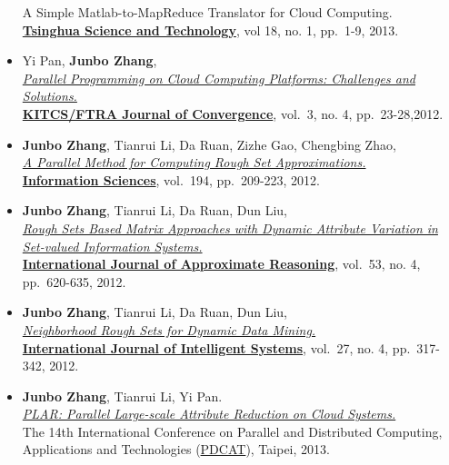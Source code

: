 \documentclass[]{article}
\begin{document}
\begin{itemize}
{{  A Simple Matlab-to-MapReduce Translator for Cloud Computing.}}\\
  \href{http://qhxb.lib.tsinghua.edu.cn/english/}{\textbf{Tsinghua
  Science and Technology}}, vol 18, no. 1, pp.~1-9, 2013.
\item
  Yi Pan, \textbf{Junbo Zhang},\\
  \href{http://www.ftrai.org/xe/index.php?mid=joc_published\&category=37964\&search_keyword=section\&search_target=title\&document_srl=38459}{\emph{Parallel
  Programming on Cloud Computing Platforms: Challenges and
  Solutions.}}\\ \href{http://www.ftrai.org/joc/}{\textbf{KITCS/FTRA
  Journal of Convergence}}, vol.~3, no. 4, pp.~23-28,2012.
\item
  \textbf{Junbo Zhang}, Tianrui Li, Da Ruan, Zizhe Gao, Chengbing
  Zhao,\\ \href{http://dx.doi.org/10.1016/j.ins.2011.12.036}{\emph{A
  Parallel Method for Computing Rough Set Approximations.}}\\
  \href{http://www.journals.elsevier.com/information-sciences}{\textbf{Information
  Sciences}}, vol.~194, pp.~209-223, 2012.
\item
  \textbf{Junbo Zhang}, Tianrui Li, Da Ruan, Dun Liu,\\
  \href{http://dx.doi.org/10.1016/j.ijar.2012.01.001}{\emph{Rough Sets
  Based Matrix Approaches with Dynamic Attribute Variation in Set-valued
  Information Systems.}}\\
  \href{http://www.journals.elsevier.com/international-journal-of-approximate-reasoning}{\textbf{International
  Journal of Approximate Reasoning}}, vol.~53, no. 4, pp.~620-635, 2012.
\item
  \textbf{Junbo Zhang}, Tianrui Li, Da Ruan, Dun Liu,\\
  \href{http://dx.doi.org/10.1002/int.21523}{\emph{Neighborhood Rough
  Sets for Dynamic Data Mining.}}\\
  \href{http://onlinelibrary.wiley.com/journal/10.1002/{[}ISSN{]}1098-111X}{\textbf{International
  Journal of Intelligent Systems}}, vol.~27, no. 4, pp.~317-342, 2012.
\item
  \textbf{Junbo Zhang}, Tianrui Li, Yi Pan.\\ \href{}{\emph{PLAR:
  Parallel Large-scale Attribute Reduction on Cloud Systems.}}\\ The
  14th International Conference on Parallel and Distributed Computing,
  Applications and Technologies
  (\href{http://pdcat13.csie.ntust.edu.tw/}{PDCAT}), Taipei, 2013.

\end{itemize}
\end{document}
